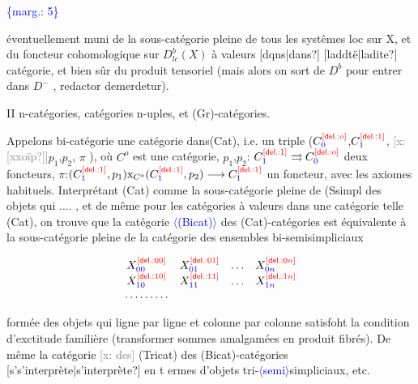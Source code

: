 \documentclass[11pt]{article}
\newcommand{\scanpage}[1]{\par\bigskip\noindent{\small\sffamily[scan #1]}\par}
\newcommand{\mspage}[1]{{\small\sffamily[p.\,#1]}}
\newcommand{\hand}[1]{\textcolor{blue}{#1}}
\newcommand{\inserted}[2][]{\textcolor{blue}{$\langle$#2$\rangle$}}
\newcommand{\margin}[1]{\textcolor{blue}{\{\textsf{marg.:} #1\}}}
\newcommand{\deleted}[1]{\textcolor{red}{[\textsf{del.:} #1]}}
\newcommand{\xout}[1]{\textcolor{gray}{[\textsf{x:} #1]}}
\newcommand{\unsure}[1]{[#1?]}
\newenvironment{diagramblock}{\par\begin{center}}{\end{center}\par}
\begin{document}
\margin{5}

\clearpage
\scanpage{162-5/6}
\mspage{5}

éventuellement muni de la sous-catégorie pleine de tous les systêmes loc
sur X, et du foncteur cohomologique sur $D^{b}_{lc}(X)$ à valeurs \unsure{dqns|dans} \unsure{laddtë|ladite}
catégorie, et bien sûr du produit tensoriel (mais alors on sort de $D^{b}$
pour entrer dans $D^{-}$ , redactor demerdetur).

II \quad n-catégories, catégories n-uples, et (Gr)-catégories.

Appelons bi-catégorie une catégorie dans(Cat), i.e. un triple
($C^{\deleted{o}}_{\hand{0}}$,$C^{\deleted{1}}_{\hand{1}}$, \xout{\unsure{xxoïp}}$p_{1}$,$p_{2}$, $\pi$ ), où $C^{o}$ est une catégorie, $p_{1}$,$p_{2}$: $C^{\deleted{1}}_{\hand{1}} \rightrightarrows C^{\deleted{o}}_{\hand{0}}$ deux
foncteurs, $\pi$:$(C^{\deleted{1}}_{\hand{1}},p_{1})\mathrm{x}_{C^{o}}(C^{\deleted{1}}_{\hand{1}},p_{2}) \longrightarrow C^{\deleted{1}}_{\hand{1}}$ un foncteur, avec les axiomes
habituels. Interprétant (Cat) comme la sous-catégorie pleine de (Ssimpl
des objets qui .... , et de même pour les catégories à valeurs dans une
catégorie telle (Cat), on trouve que la catégorie \inserted[typed]{(Bicat)} des (Cat)-catégories
est équivalente à la sous-catégorie pleine de la catégorie des ensembles
bi-semisimpliciaux

\begin{diagramblock}\[\begin{array}{cccc}
X^{\deleted{00}}_{\hand{00}} & X^{\deleted{01}}_{\hand{01}} & \ldots & X^{\deleted{0n}}_{\hand{0n}}\\
X^{\deleted{10}}_{\hand{10}} & X^{\deleted{11}}_{\hand{11}} & \ldots & X^{\deleted{1n}}_{\hand{1n}}\\
\ldots\ldots\ldots & & &
\end{array}\]\end{diagramblock}

formée des objets qui ligne par ligne et colonne par colonne satisfoht la
condition d'exctitude familière (transformer sommes amalgamées en produit
fibrés). De même la catégorie \xout{des} (Tricat) des (Bicat)-catégories
\unsure{s's'interprète|s'interprète} en t ermes d'objets tri-\inserted[typed]{semi}simpliciaux, etc.
\end{document}
